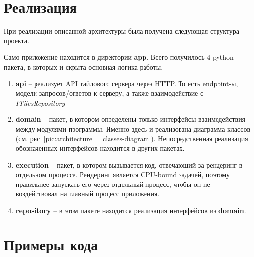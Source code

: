 \section*{\Large{Реализация}}

При реализации описанной архитектуры была получена следующая структура проекта.

Само приложение находится в директории \textbf{app}.
Всего получилось 4 python-пакета, в которых и скрыта основная логика работы.
\begin{enumerate}
    \item \textbf{api} -- реализует API тайлового сервера через HTTP. То есть endpoint-ы,
    модели запросов/ответов к серверу, а также взаимодействие с \textit{ITilesRepository}
    \item \textbf{domain} -- пакет, в котором определены только интерфейсы взаимодействия между модулями программы.
    Именно здесь и реализована диаграмма классов (см. рис\ \ref{pic:architecture__classes-diagram}). Непосредственная
    реализация обозначенных интерфейсов находится в других пакетах.
    \item \textbf{execution} -- пакет, в котором вызывается код, отвечающий за рендеринг в отдельном процессе.
    Рендеринг является CPU-bound задачей, поэтому правильнее
    запускать его через отдельный процесс, чтобы он не воздействовал на главный процесс приложения.
    \item \textbf{repository} -- в этом пакете находится реализация интерфейсов из \textbf{domain}.
\end{enumerate}

\section*{\Large{Примеры кода}}

